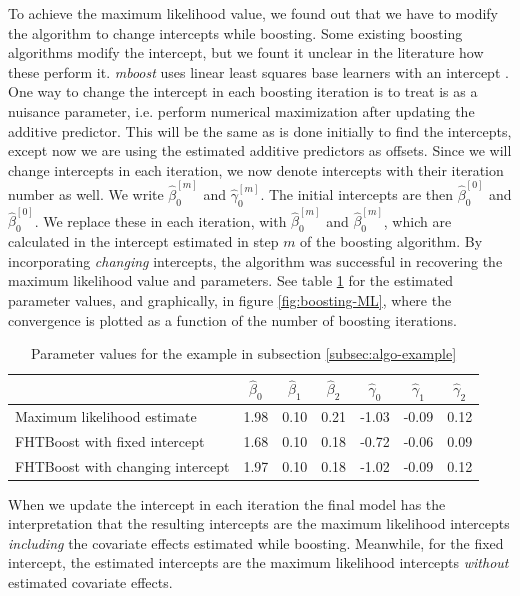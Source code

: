 To achieve the maximum likelihood value, we found out that we have to modify the algorithm to change intercepts while boosting.
Some existing boosting algorithms modify the intercept, but we fount it unclear in the literature how these perform it.
\textit{mboost} uses linear least squares base learners with an intercept \citep{mboost}.
One way to change the intercept in each boosting iteration is to treat is as a nuisance parameter, i.e. perform numerical maximization after updating the additive predictor.
This will be the same as is done initially to find the intercepts, except now we are using the estimated additive predictors as offsets.
Since we will change intercepts in each iteration, we now denote intercepts with their iteration number as well.
We write $\hat{\beta}_{0}^{[m]}$ and $\hat{\gamma}_{0}^{[m]}$.
The initial intercepts are then $\hat{\beta}_{0}^{[0]}$ and $\hat{\beta}_{0}^{[0]}$.
We replace these in each iteration, with $\hat{\beta}_{0}^{[m]}$ and $\hat{\beta}_{0}^{[m]}$, which are calculated in the intercept estimated in step $m$ of the boosting algorithm.
By incorporating \textit{changing} intercepts, the algorithm was successful in recovering the maximum likelihood value and parameters.
See table \ref{table:ML} for the estimated parameter values, and graphically, in figure \ref{fig:boosting-ML}, where the convergence is plotted as a function of the number of boosting iterations.
\begin{table}\caption{Parameter values for the example in subsection \ref{subsec:algo-example}}
\label{table:ML}
\centering
\begin{tabular}{lcccccc}
\toprule
    & $\hat{\beta}_{0}$ & $\hat{\beta}_{1}$ & $\hat{\beta}_{2}$ & $\hat{\gamma}_{0}$ & $\hat{\gamma}_{1}$ & $\hat{\gamma}_{2}$ \\
\hline
Maximum likelihood estimate                   &    1.98 &    0.10 &    0.21 &    -1.03 &    -0.09 &     0.12 \\
FHTBoost with fixed intercept                 &    1.68 &    0.10 &    0.18 &    -0.72 &    -0.06 &     0.09 \\
FHTBoost with changing intercept              &    1.97 &    0.10 &    0.18 &    -1.02 &    -0.09 &     0.12 \\
\bottomrule
\end{tabular}
\end{table}
When we update the intercept in each iteration the final model has the interpretation that the resulting intercepts are the maximum likelihood intercepts \textit{including} the covariate effects estimated while boosting.
Meanwhile, for the fixed intercept, the estimated intercepts are the maximum likelihood intercepts \textit{without} estimated covariate effects.

